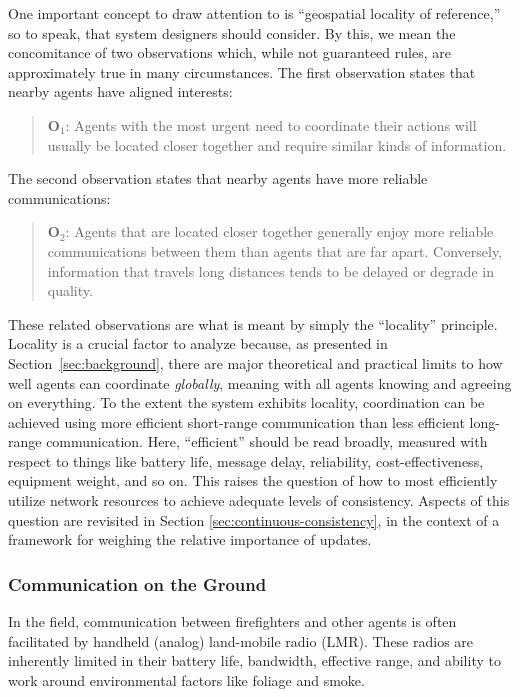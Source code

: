 \documentclass[]             %
{NASA}                       %
\theoremstyle{definition}
\begin{document}
One important concept to draw attention to is  ``geospatial
locality of reference,'' so to speak, that system designers should consider. By
this, we mean the concomitance of two observations which, while not
guaranteed rules, are approximately true in many circumstances. The
first observation states that nearby agents have aligned interests:
\begin{quote}
  $\textbf{O}_1$: Agents with the most urgent need to coordinate their
  actions will usually be located closer together and require similar
  kinds of information.
\end{quote}
The second observation states that nearby agents have more reliable
communications:
\begin{quote}
  $\textbf{O}_2$: Agents that are located closer together generally
  enjoy more reliable communications between them than agents that are
  far apart. Conversely, information that travels long distances tends to
  be delayed or degrade in quality.
\end{quote}

These related observations are what is meant by simply the
``locality'' principle. Locality is a crucial factor to analyze
because, as presented in Section~\ref{sec:background}, there are major
theoretical and practical limits to how well agents can coordinate
\emph{globally}, meaning with all agents knowing and agreeing on
everything. To the extent the system exhibits locality, coordination
can be achieved using more efficient short-range communication than
less efficient long-range communication. Here, ``efficient'' should be
read broadly, measured with respect to things like battery life,
message delay, reliability, cost-effectiveness, equipment weight, and
so on. This raises the question of how to most efficiently utilize
network resources to achieve adequate levels of consistency. Aspects
of this question are revisited in Section
\ref{sec:continuous-consistency}, in the context of a framework for
weighing the relative importance of updates.

\subsubsection{Communication on the Ground}
\label{sssec:ground-communication}
In the field, communication between firefighters and other agents is
often facilitated by handheld (analog) land-mobile radio (LMR). These
radios are inherently limited in their battery life, bandwidth,
effective range, and ability to work around environmental factors like
foliage and smoke.
\end{document}
